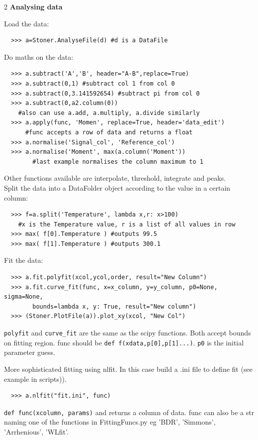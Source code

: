 \documentclass[a4paper,9pt,threecolumn,landscape]{scrartcl}
\begin{document}
\begin{multicols}{2}
\vspace{0.2cm}
\textbf {Analysing data}
\vspace{0.2cm}\normalfont

Load the data:
\begin{verbatim}
  >>> a=Stoner.AnalyseFile(d) #d is a DataFile
\end{verbatim}
Do maths on the data:
\begin{verbatim}
  >>> a.subtract('A','B', header="A-B",replace=True)
  >>> a.subtract(0,1) #subtract col 1 from col 0
  >>> a.subtract(0,3.141592654) #subtract pi from col 0
  >>> a.subtract(0,a2.column(0))
    #also can use a.add, a.multiply, a.divide similarly
  >>> a.apply(func, 'Momen', replace=True, header='data_edit')
      #func accepts a row of data and returns a float 
  >>> a.normalise('Signal_col', 'Reference_col')
  >>> a.normalise('Moment', max(a.column('Moment'))
  		#last example normalises the column maximum to 1
\end{verbatim}
Other functions available are interpolate, threshold, integrate and peaks.\\

Split the data into a DataFolder object according to the value in a certain column:
\begin{verbatim}
  >>> f=a.split('Temperature', lambda x,r: x>100)
  	#x is the Temperature value, r is a list of all values in row
  >>> max( f[0].Temperature ) #outputs 99.5
  >>> max( f[1].Temperature ) #outputs 300.1
\end{verbatim} 
Fit the data:
\begin{verbatim}
  >>> a.fit.polyfit(xcol,ycol,order, result="New Column")
  >>> a.fit.curve_fit(func, x=x_column, y=y_column, p0=None, sigma=None,
        bounds=lambda x, y: True, result="New column")
  >>> (Stoner.PlotFile(a)).plot_xy(xcol, "New Col")
\end{verbatim}
\verb+polyfit+ and \verb+curve_fit+ are the same as the scipy functions. Both accept bounds on fitting region. func should be \verb+def f(xdata,p[0],p[1]...)+.
\verb+p0+ is the initial parameter guess.

More sophisticated fitting using nlfit. In this case build a .ini file to define fit (see example in scripts)).
\begin{verbatim}
  >>> a.nlfit("fit.ini", func)
\end{verbatim}
\verb+def func(xcolumn, params)+ and returns a column of data.
func can also be a str naming one of the functions in FittingFuncs.py eg 'BDR', 'Simmons', 'Arrhenious', 'WLfit'.
 

\end{multicols}
\end{document}

